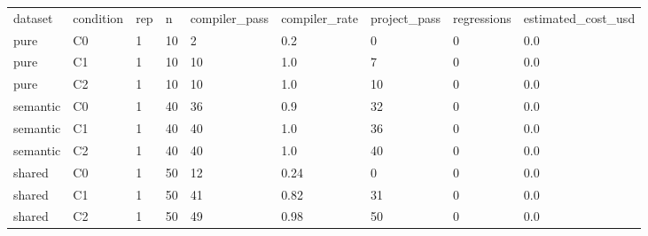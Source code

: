 \begin{tabular}{lllllllll}
dataset & condition & rep & n & compiler\_pass & compiler\_rate & project\_pass & regressions & estimated\_cost\_usd \\
pure & C0 & 1 & 10 & 2 & 0.2 & 0 & 0 & 0.0 \\
pure & C1 & 1 & 10 & 10 & 1.0 & 7 & 0 & 0.0 \\
pure & C2 & 1 & 10 & 10 & 1.0 & 10 & 0 & 0.0 \\
semantic & C0 & 1 & 40 & 36 & 0.9 & 32 & 0 & 0.0 \\
semantic & C1 & 1 & 40 & 40 & 1.0 & 36 & 0 & 0.0 \\
semantic & C2 & 1 & 40 & 40 & 1.0 & 40 & 0 & 0.0 \\
shared & C0 & 1 & 50 & 12 & 0.24 & 0 & 0 & 0.0 \\
shared & C1 & 1 & 50 & 41 & 0.82 & 31 & 0 & 0.0 \\
shared & C2 & 1 & 50 & 49 & 0.98 & 50 & 0 & 0.0 \\
\end{tabular}